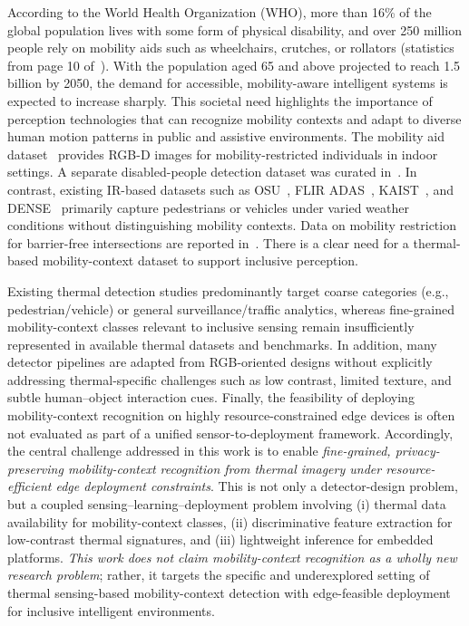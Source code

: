 \documentclass[journal,twoside,web]{ieeecolor}
\begin{document}
According to the World Health Organization (WHO), more than 16\% of the global population lives with some form of physical disability, and over 250 million people rely on mobility aids such as wheelchairs, crutches, or rollators (statistics from page 10 of~\cite{un2020ageing}). With the population aged 65 and above projected to reach 1.5 billion by 2050, the demand for accessible, mobility-aware intelligent systems is expected to increase sharply. This societal need highlights the importance of perception technologies that can recognize mobility contexts and adapt to diverse human motion patterns in public and assistive environments. The mobility aid dataset~\cite{vasquez2017deep,kollmitz2019deep} provides RGB-D images for mobility-restricted individuals in indoor settings. A separate disabled-people detection dataset was curated in~\cite{alruwaili2024deep}. In contrast, existing IR-based datasets such as OSU~\cite{davis2007background}, FLIR ADAS~\cite{flir_adas_dataset}, KAIST~\cite{choi2018kaist}, and DENSE~\cite{bijelic2020seeing} primarily capture pedestrians or vehicles under varied weather conditions without distinguishing mobility contexts. Data on mobility restriction for barrier-free intersections are reported in~\cite{ni2025thermal}. There is a clear need for a thermal-based mobility-context dataset to support inclusive perception.

{Existing thermal detection studies predominantly target coarse categories (e.g., pedestrian/vehicle) or general surveillance/traffic analytics, whereas fine-grained mobility-context classes relevant to inclusive sensing remain insufficiently represented in available thermal datasets and benchmarks. In addition, many detector pipelines are adapted from RGB-oriented designs without explicitly addressing thermal-specific challenges such as low contrast, limited texture, and subtle human--object interaction cues. Finally, the feasibility of deploying mobility-context recognition on highly resource-constrained edge devices is often not evaluated as part of a unified sensor-to-deployment framework. Accordingly, the central challenge addressed in this work is to enable \emph{fine-grained, privacy-preserving mobility-context recognition from thermal imagery under resource-efficient edge deployment constraints}. This is not only a detector-design problem, but a coupled sensing--learning--deployment problem involving (i) thermal data availability for mobility-context classes, (ii) discriminative feature extraction for low-contrast thermal signatures, and (iii) lightweight inference for embedded platforms. \emph{This work does not claim mobility-context recognition as a wholly new research problem}; rather, it targets the specific and underexplored setting of thermal sensing-based mobility-context detection with edge-feasible deployment for inclusive intelligent environments.}
\end{document}

